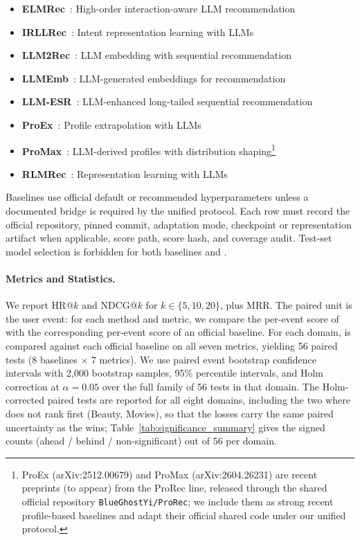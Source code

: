 \begin{itemize}
    \item \textbf{ELMRec}~\cite{elmrec}: High-order interaction-aware LLM recommendation
    \item \textbf{IRLLRec}~\cite{irllrec}: Intent representation learning with LLMs
    \item \textbf{LLM2Rec}~\cite{llm2rec}: LLM embedding with sequential recommendation
    \item \textbf{LLMEmb}~\cite{llmemb}: LLM-generated embeddings for recommendation
    \item \textbf{LLM-ESR}~\cite{llmesr}: LLM-enhanced long-tailed sequential recommendation
    \item \textbf{ProEx}~\cite{proex}: Profile extrapolation with LLMs
    \item \textbf{ProMax}~\cite{promax}: LLM-derived profiles with distribution shaping\footnote{ProEx (arXiv:2512.00679) and ProMax (arXiv:2604.26231) are recent preprints (to appear) from the ProRec line, released through the shared official repository \texttt{BlueGhostYi/ProRec}; we include them as strong recent profile-based baselines and adapt their official shared code under our unified protocol.}
    \item \textbf{RLMRec}~\cite{rlmrec}: Representation learning with LLMs
\end{itemize}

Baselines use official default or recommended hyperparameters unless a
documented bridge is required by the unified protocol. Each row must record the
official repository, pinned commit, adaptation mode, checkpoint or
representation artifact when applicable, score path, score hash, and coverage
audit. Test-set model selection is forbidden for both baselines and \method.



\paragraph{Metrics and Statistics.} We report HR@$k$ and NDCG@$k$ for
$k\in\{5,10,20\}$, plus MRR. The paired unit is the user event: for each
method and metric, we compare the per-event score of \method{} with the
corresponding per-event score of an official baseline. For each domain,
\method{} is compared against each official baseline on all seven metrics,
yielding 56 paired tests (8 baselines $\times$ 7 metrics). We use paired
event bootstrap confidence intervals with 2,000 bootstrap samples, 95\%
percentile intervals, and Holm correction at $\alpha=0.05$ over the full
family of 56 tests in that domain. The Holm-corrected paired tests are
reported for all eight domains, including the two where \method{} does not
rank first (Beauty, Movies), so that the losses carry the same paired
uncertainty as the wins; Table~\ref{tab:significance_summary} gives the signed
counts (ahead / behind / non-significant) out of 56 per domain.

